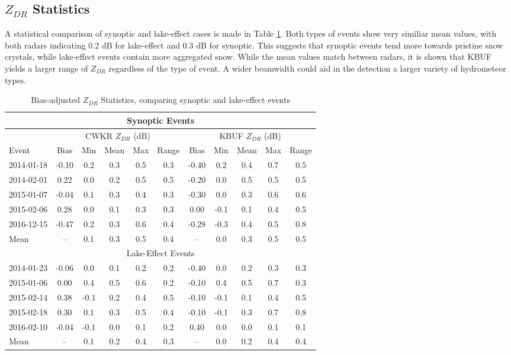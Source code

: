\subsection{$Z_{DR}$ Statistics}
A statistical comparison of synoptic and lake-effect cases is made in Table \ref{eventcompare}. Both types of events show very similiar mean values, with both radars indicating 0.2 dB for lake-effect and 0.3 dB for synoptic. This suggests that synoptic events tend more towards pristine snow crystals, while lake-effect events contain more aggregated snow. While the mean values match between radars, it is shown that KBUF yields a larger range of $Z_{DR}$ regardless of the type of event. A wider beamwidth could aid in the detection a larger variety of hydrometeor types.
\begin{table}[H]
    \caption{Bias-adjusted $Z_{DR}$ Statistics, comparing synoptic and lake-effect events}\label{eventcompare}
    \begin{center}
    \begin{tabular}{|l|c|c|c|c|c|c|c|c|c|c|}
    \hline 
    \multicolumn{11}{|c|}{Synoptic Events} \\
    \hline
     &
    \multicolumn{5}{|c|}{CWKR $Z_{DR}$ (dB)} & 
    \multicolumn{5}{|c|}{KBUF $Z_{DR}$ (dB)} \\
    \hline 
     Event & Bias & Min & Mean & Max & Range & Bias & Min & Mean & Max & Range\\
    \hline\hline
    2014-01-18 & -0.10 & 0.2 & 0.3 & 0.5 & 0.3 & -0.40 & 0.2 & 0.4 & 0.7 & 0.5 \\
    \hline
    2014-02-01 & 0.22 & 0.0 & 0.2 & 0.5 & 0.5  & -0.20 & 0.0 & 0.5 & 0.5 & 0.5 \\    
    \hline
    2015-01-07 & -0.04 & 0.1 & 0.3 & 0.4  & 0.3 & -0.30 & 0.0 & 0.3 & 0.6 & 0.6 \\ 
    \hline
    2015-02-06 & 0.28 & 0.0 & 0.1 & 0.3 & 0.3 & 0.00 & -0.1 & 0.1 & 0.4 & 0.5\\
    \hline
    2016-12-15 & -0.47 & 0.2 & 0.3 & 0.6 & 0.4 & -0.28 &  -0.3 & 0.4 & 0.5 & 0.8  \\ 
    \hline 
    Mean  & -- & 0.1 & 0.3 & 0.5 & 0.4 & -- & 0.0 & 0.3 & 0.5 & 0.5 \\
    \hline
    \multicolumn{11}{|c|}{Lake-Effect Events} \\
    \hline\hline
    2014-01-23 & -0.06 & 0.0 & 0.1 & 0.2  & 0.2 & -0.40 & 0.0 & 0.2 & 0.3 & 0.3\\
    \hline
    2015-01-06  & 0.00 & 0.4 & 0.5 & 0.6   & 0.2 & -0.10 & 0.4 & 0.5 & 0.7 & 0.3 \\
    \hline
    2015-02-14 & 0.38 & -0.1 & 0.2 & 0.4  &  0.5 & -0.10 & -0.1 & 0.1 & 0.4 & 0.5 \\
    \hline
    2015-02-18 & 0.30 & 0.1 & 0.3 & 0.5 & 0.4 & -0.10 & -0.1 & 0.3 & 0.7 & 0.8 \\ 
    \hline
    2016-02-10 & -0.04 & -0.1 & 0.0 & 0.1 & 0.2 &  0.40 & 0.0 & 0.0 & 0.1 & 0.1  \\ 
    \hline\hline
    Mean & -- & 0.1 & 0.2 & 0.4 & 0.3 & -- & 0.0 & 0.2 & 0.4 & 0.4  \\
    \hline
    \end{tabular}
    \end{center}
\end{table}

